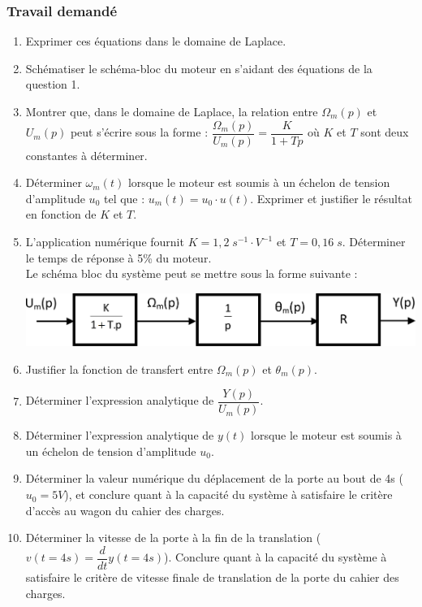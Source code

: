 \subsubsection{Travail demandé}
\begin{enumerate}
\item Exprimer ces équations dans le domaine de Laplace.
\item Schématiser le schéma-bloc du moteur en s’aidant des équations de la question 1.
\item Montrer que, dans le domaine de Laplace, la relation entre $\Omega_m (p)$ et $U_m (p)$ peut s'écrire sous la forme : $\dfrac{\Omega_m(p)}{U_m(p)} = \dfrac{K}{1+Tp} $ où $K$ et $T$ sont deux constantes à déterminer.
\item Déterminer $\omega_m (t)$ lorsque le moteur est soumis à un échelon de tension d'amplitude $u_0$ tel que : $u_m (t)= u_0 \cdot u(t)$. Exprimer et justifier le résultat en fonction de $K$ et $T$.
\item L'application numérique fournit $K=1,2 \; s^{-1}\cdot V^{-1}$ et $T=0,16\;s$. Déterminer le temps de réponse à 5\% du moteur.\\
Le schéma bloc du système peut se mettre sous la forme suivante :
\begin{center}
\includegraphics[width=.5\textwidth]{png/fig_04-TGV}
\end{center} 
\item Justifier la fonction de transfert entre $\Omega_m(p)$ et $\theta_m (p)$.
\item Déterminer l'expression analytique de $\dfrac{Y(p)}{U_m(p)}$.
\item Déterminer l'expression analytique de $y(t)$ lorsque le moteur est soumis à un échelon de tension d'amplitude $u_0$.
\item Déterminer la valeur numérique du déplacement de la porte au bout de 4s ($u_0 =5V$), et conclure quant à la capacité du système à satisfaire le critère d'accès au wagon du cahier des charges.
\item Déterminer la vitesse de la porte à la fin de la translation ($v(t=4s)= \dfrac{d}{dt}y(t=4s)$). Conclure quant à la capacité du système à satisfaire le critère de vitesse finale de translation de la porte du cahier des charges.
\end{enumerate}
\newpage



